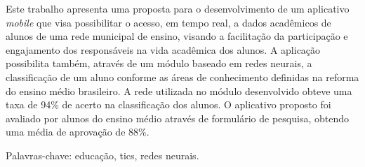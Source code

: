 \begin{resumo}
    Este trabalho apresenta uma proposta para o desenvolvimento de um aplicativo \textit{mobile} que visa possibilitar o acesso, em tempo real, a dados acadêmicos de alunos de uma rede municipal de ensino, visando a facilitação da participação e engajamento dos responsáveis na vida acadêmica dos alunos. A aplicação possibilita também, através de um módulo baseado em redes neurais, a classificação de um aluno conforme as áreas de conhecimento definidas na reforma do ensino médio brasileiro. A rede utilizada no módulo desenvolvido obteve uma taxa de 94\% de acerto na classificação dos alunos. O aplicativo proposto foi avaliado por alunos do ensino médio através de formulário de pesquisa, obtendo uma média de aprovação de 88\%.
    
    Palavras-chave: educação, tics, redes neurais.
\end{resumo}